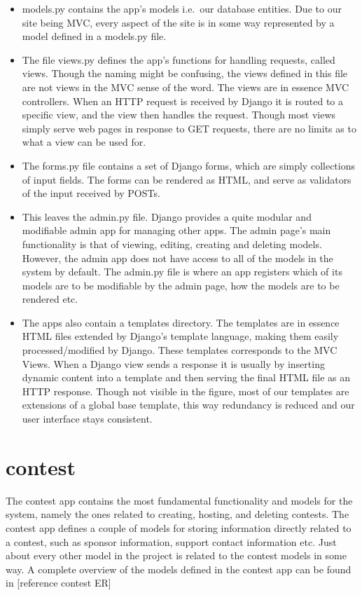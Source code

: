 \begin{itemize}
    \item models.py contains the app's models i.e.\ our database entities. Due
        to our site being MVC, every aspect of the site is in some way
        represented by a model defined in a models.py file.

    \item The file views.py defines the app's functions for
    handling requests, called views. Though the naming might be confusing,
    the views defined in this file are not views in the MVC sense of the
    word. The views are in essence MVC controllers. When an HTTP request is
    received by Django it is routed to a specific view, and the view then
    handles the request. Though most views simply serve web pages in
    response to GET requests, there are no limits as to what a view can be
    used for. 

    \item The forms.py file contains a set of Django forms, which are simply
    collections of input fields. The forms can be rendered as HTML, and
    serve as validators of the input received by POSTs. 

    \item This leaves the admin.py file. Django provides a quite modular and
    modifiable admin app for managing other apps. The admin
    page's main functionality is that of viewing, editing,
    creating and deleting models. However, the admin app does not have
    access to all of the models in the system by default. The admin.py file
    is where an app registers which of its models are to be modifiable by
    the admin page, how the models are to be rendered etc.

    \item The apps also contain a templates directory. The templates are in
    essence HTML files extended by Django's template language, making them
    easily processed/modified by Django. These templates corresponds to the MVC
    Views.  When a Django view sends a response it is usually by inserting
    dynamic content into a template and then serving the final HTML file as an
    HTTP response. Though not visible in the figure, most of our templates are
    extensions of a global base template, this way redundancy is reduced and
    our user interface stays consistent.
\end{itemize}

\bigskip

\section{contest}
The contest app contains the most fundamental functionality and models for the system,
namely the ones related to creating, hosting, and deleting contests. 
The contest app defines a couple of models
for storing information directly related to a contest, such as sponsor
information, support contact information etc. Just about every
other model in the project is related to the contest models in some way.
A complete overview of the models defined in the contest app can be
found in [reference contest ER]


